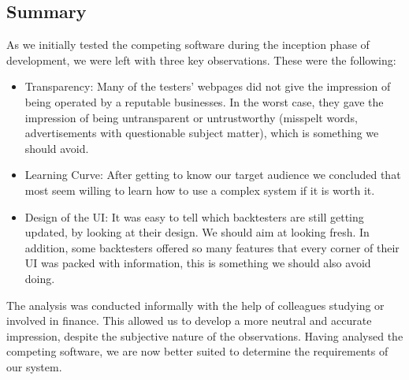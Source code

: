 \documentclass[main.tex]{subfiles}
\begin{document}
\subsection{Summary}

As we initially tested the competing software during the inception phase of development, we were left with three key observations. These were the following:

\begin{itemize}
    \item Transparency: Many of the testers' webpages did not give the impression of being operated by a reputable businesses. In the worst case, they gave the impression of being untransparent or untrustworthy (misspelt words, advertisements with questionable subject matter), which is something we should avoid.
    \item Learning Curve: After getting to know our target audience we concluded that most seem willing to learn how to use a complex system if it is worth it.
    \item Design of the UI: It was easy to tell which backtesters are still getting updated, by looking at their design. We should aim at looking fresh. In addition, some backtesters offered so many features that every corner of their UI was packed with information, this is something we should also avoid doing.
\end{itemize}

The analysis was conducted informally with the help of colleagues studying or involved in finance. This allowed us to develop a more neutral and accurate impression, despite the subjective nature of the observations. Having analysed the competing software, we are now better suited to determine the requirements of our system. 
\end{document}
